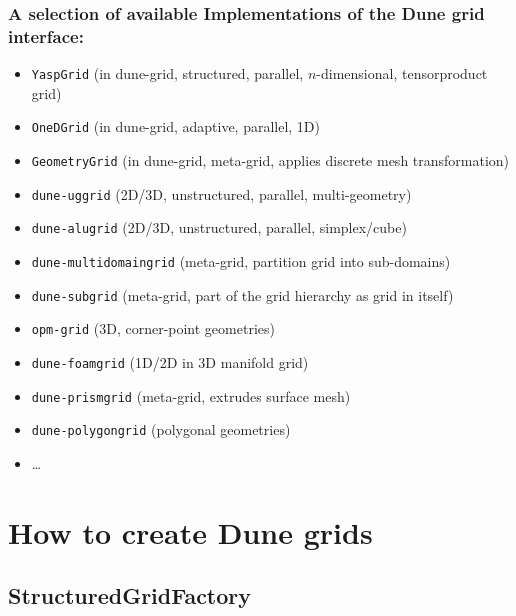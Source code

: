 \documentclass[aspectratio=169,11pt]{beamer}
\theoremstyle{definition}
\begin{document}
\begin{frame}
  \frametitle{A selection of available Implementations of the Dune grid interface:}
  \begin{itemize}
  \item \lstinline!YaspGrid! (in dune-grid, structured, parallel, $n$-dimensional, tensorproduct grid)
  \item \lstinline!OneDGrid! (in dune-grid, adaptive, parallel, 1D)
  \item \lstinline!GeometryGrid! (in dune-grid, meta-grid, applies discrete mesh transformation)
  \item \lstinline!dune-uggrid! (2D/3D, unstructured, parallel, multi-geometry)
  \item \lstinline!dune-alugrid! (2D/3D, unstructured, parallel, simplex/cube)
  \item \lstinline!dune-multidomaingrid! (meta-grid, partition grid into sub-domains)
  \item \lstinline!dune-subgrid! (meta-grid, part of the grid hierarchy as grid in itself)
  \item \lstinline!opm-grid! (3D, corner-point geometries)
  \item \lstinline!dune-foamgrid! (1D/2D in 3D manifold grid)
  \item \lstinline!dune-prismgrid! (meta-grid, extrudes surface mesh)
  \item \lstinline!dune-polygongrid! (polygonal geometries)
  \item \ldots{}
  \end{itemize}
\end{frame}

\section{How to create Dune grids}

\subsection{StructuredGridFactory}
\end{document}
